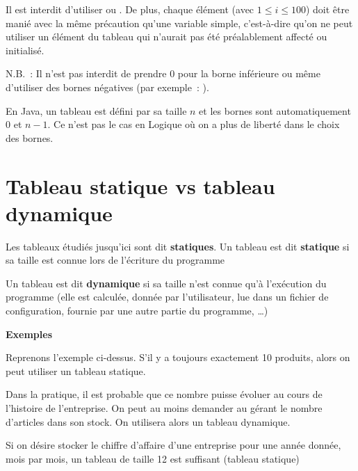 	Il est interdit d’utiliser  ou
	. De plus, chaque élément
	 (avec $1 \leq i \leq 100$) doit
	être manié avec la même précaution qu’une variable simple, c’est-à-dire
	qu’on ne peut utiliser un élément du tableau qui n’aurait pas été
	préalablement affecté ou initialisé.

	N.B.~: Il n'est pas interdit de prendre 0 pour la borne
	inférieure ou même d'utiliser des bornes négatives
	(par exemple~: ).

	En Java, un tableau est défini par sa taille $n$ et les bornes sont
	automatiquement $0$ et $n-1$. Ce n'est pas le cas en
	Logique où on a plus de liberté dans le choix des bornes.

\section{Tableau statique vs tableau dynamique}

	Les tableaux étudiés jusqu'ici sont dit \textbf{statiques}.
	Un tableau est dit \textbf{statique} si sa taille 
	est connue lors de l’écriture du programme

	Un tableau est dit \textbf{dynamique}
	si sa taille n’est connue qu’à l’exécution du programme (elle est
	calculée, donnée par l’utilisateur, lue dans un fichier de
	configuration, fournie par une autre partie du programme, \dots)

	\textbf{Exemples}

	\begin{liste}
	\item
		Reprenons l’exemple ci-dessus. 
		S’il y a toujours exactement 10 produits, 
		alors on peut utiliser un tableau statique. 
	\item
		Dans la pratique, il est probable que ce nombre puisse évoluer 
		au cours de l’histoire de l’entreprise.
		On peut au moins demander au gérant le nombre d'articles dans son stock.
		On utilisera alors un tableau dynamique.
	\item 
		Si on désire stocker le chiffre d’affaire d’une entreprise 
		pour une année donnée, mois par mois, un tableau de
		taille 12 est suffisant (tableau statique)
	
	\end{liste}
	
